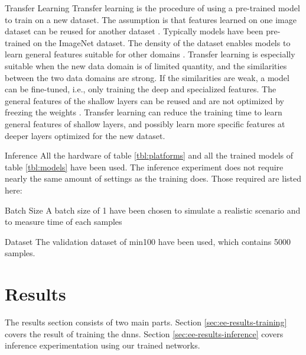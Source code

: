 \begin{enumdescript}
\begin{enumdescript}
		\item[Transfer Learning] Transfer learning is the procedure of using a pre-trained model to train on a new dataset. The assumption is that features learned on one image dataset can be reused for another dataset \cite{yosinski_how_2014}. Typically models have been pre-trained on the ImageNet dataset. The density of the dataset enables models to learn general features suitable for other domains \cite{kornblith_better_2019}. Transfer learning is especially suitable when the new data domain is of limited quantity, and the similarities between the two data domains are strong. If the similarities are weak, a model can be fine-tuned, i.e., only training the deep and specialized features. The general features of the shallow layers can be reused and are not optimized by freezing the weights \cite{li_cs231n:_2018}. Transfer learning can reduce the training time to learn general features of shallow layers, and possibly learn more specific features at deeper layers optimized for the new dataset.
	\end{enumdescript}
	
	\item[Inference]  All the hardware of table \ref{tbl:platforms} and all the trained models of table \ref{tbl:models} have been used. The inference experiment does not require nearly the same amount of settings as the training does. Those required are listed here:
	\begin{enumdescript}
		\item[Batch Size] A batch size of 1 have been chosen to simulate a realistic scenario and to measure time of each samples
		\item[Dataset] The validation dataset of \gls{min100} have been used, which contains 5000 samples.
	\end{enumdescript} 
	
\end{enumdescript}

\section{Results} \label{sec:ee-results}

The results section consists of two main parts. Section \ref{sec:ee-results-training} covers the result of training the \gls{dnn}s. Section \ref{sec:ee-results-inference} covers inference experimentation using our trained networks. 

